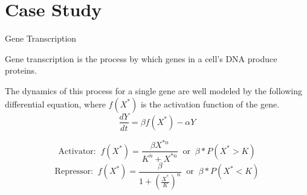 \documentclass{beamer}
\begin{document}
\section{Case Study}

\begin{frame}{Gene Transcription}
    \begin{large}
        Gene transcription is the process by which genes in a cell’s DNA produce proteins.

        \vspace*{0.125in}
        The dynamics of this process for a single gene are well modeled by the following differential equation, where $f(X^*)$ is the activation function of the gene.
        $$\frac{dY}{dt}=\beta f(X^*) - \alpha Y$$

        $$\text{Activator: } \ f(X^*)=\frac{\beta X^{*n}}{K^n + X^{*n}} \ \text{ or } \ \beta * P(X^* > K)$$
        $$\text{Repressor: } \ f(X^*)=\frac{\beta}{1 + \left(\frac{X^*}{K}\right)^n} \ \text{ or } \ \beta * P(X^* < K)$$

    \end{large}
\end{frame}
\end{document}
